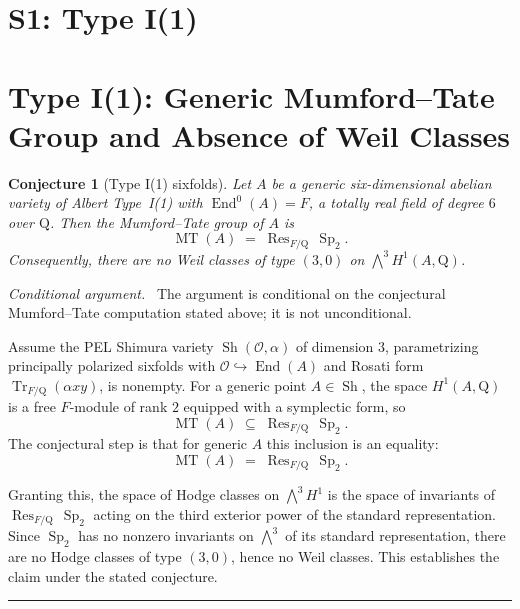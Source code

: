 \documentclass{article}
\DeclareMathOperator{\MT}{MT}
\DeclareMathOperator{\Res}{Res}
\DeclareMathOperator{\Sh}{Sh}
\DeclareMathOperator{\Sp}{Sp}
\DeclareMathOperator{\Tr}{Tr}
\DeclareMathOperator{\End}{End}
\newcommand{\Q}{\mathrm{Q}}
\newcommand{\cO}{\mathcal{O}}
\newtheorem{conjecture}{Conjecture}
\newenvironment{proof}[1][Proof]{\par\noindent\textit{#1.}\ }{\hfill\rule{1.2ex}{1.2ex}\par}
\begin{document}
\section{S1: Type I(1)}
\section{Type I(1): Generic Mumford--Tate Group and Absence of Weil Classes}

\begin{conjecture}[Type I(1) sixfolds]
Let $A$ be a generic six-dimensional abelian variety of Albert Type~I(1) with
$\End^0(A) = F$, a totally real field of degree $6$ over $\Q$. Then the
Mumford--Tate group of $A$ is
\[
  \MT(A) \;=\; \Res_{F/\Q}\,\Sp_2 .
\]
Consequently, there are no Weil classes of type $(3,0)$ on
$\bigwedge^3 H^1(A,\Q)$.
\end{conjecture}

\begin{proof}[Conditional argument]
The argument is conditional on the conjectural Mumford--Tate computation
stated above; it is not unconditional.

Assume the PEL Shimura variety $\Sh(\cO,\alpha)$ of dimension $3$,
parametrizing principally polarized sixfolds with
$\cO \hookrightarrow \End(A)$ and Rosati form
$\Tr_{F/\Q}(\alpha x y)$, is nonempty. For a generic point
$A \in \Sh$, the space $H^1(A,\Q)$ is a free $F$-module of rank $2$
equipped with a symplectic form, so
\[
  \MT(A) \;\subseteq\; \Res_{F/\Q}\,\Sp_2 .
\]
The conjectural step is that for generic $A$ this inclusion is an equality:
\[
  \MT(A) \;=\; \Res_{F/\Q}\,\Sp_2 .
\]

Granting this, the space of Hodge classes on $\bigwedge^3 H^1$ is the space
of invariants of $\Res_{F/\Q}\,\Sp_2$ acting on the third exterior power of
the standard representation. Since $\Sp_2$ has no nonzero invariants on
$\bigwedge^3$ of its standard representation, there are no Hodge classes of
type $(3,0)$, hence no Weil classes. This establishes the claim under the
stated conjecture.
\end{proof}
\end{document}
